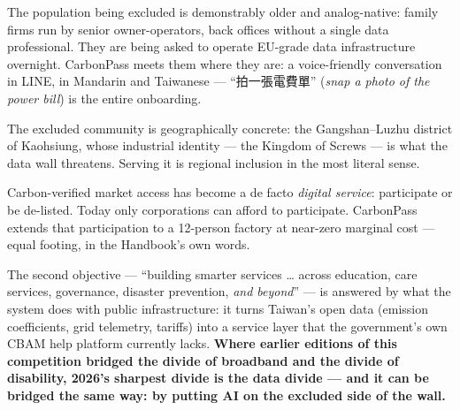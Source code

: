 \begin{description}[leftmargin=1.2em,style=nextline]
\item[Ages.] The population being excluded is demonstrably older and
analog-native: family firms run by senior owner-operators, back offices
without a single data professional\cite{moea,cw}. They are being asked to
operate EU-grade data infrastructure overnight. CarbonPass meets them where
they are: a voice-friendly conversation in LINE, in Mandarin and Taiwanese ---
``{\cjk 拍一張電費單}'' (\emph{snap a photo of the power bill}) is the entire
onboarding.
\item[Regions.] The excluded community is geographically concrete: the
Gangshan--Luzhu district of Kaohsiung, whose industrial identity --- the
Kingdom of Screws --- is what the data wall threatens. Serving it is regional
inclusion in the most literal sense.
\item[Needs.] Carbon-verified market access has become a de facto
\emph{digital service}: participate or be de-listed. Today only corporations
can afford to participate. CarbonPass extends that participation to a
12-person factory at near-zero marginal cost --- equal footing, in the
Handbook's own words.
\end{description}

The second objective --- ``building smarter services \ldots{} across
education, care services, governance, disaster prevention, \emph{and
beyond}''\cite{handbook} --- is answered by what the system does with public
infrastructure: it turns Taiwan's open data (emission coefficients, grid
telemetry, tariffs) into a service layer that the government's own CBAM help
platform currently lacks\cite{tpt-cbam}. \textbf{Where earlier editions of
this competition bridged the divide of broadband and the divide of
disability, 2026's sharpest divide is the data divide --- and it can be
bridged the same way: by putting AI on the excluded side of the wall.}
